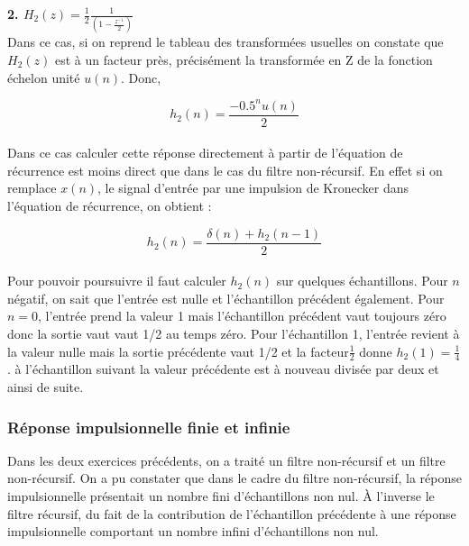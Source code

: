 \documentclass[11pt,a4paper]{article}
\begin{document}
\textbf{2. $H_2(z) = \frac{1}{2}\frac{1}{(1 - \frac{z^{-1}}{2})}$}\\

Dans ce cas, si on reprend le tableau des transformées usuelles on constate que $H_2(z)$ est à un facteur près, précisément la transformée en Z de la fonction échelon unité $u(n)$. Donc, 

\[h_2(n) = \frac{-0.5^n u(n)}{2}\]\\

Dans ce cas calculer cette réponse directement à partir de l'équation de récurrence est moins direct que dans le cas du filtre non-récursif. En effet si on remplace $x(n)$, le signal d'entrée par une impulsion de Kronecker dans l'équation de récurrence, on obtient :

\[h_2(n) = \frac{\delta(n) + h_2(n-1)}{2}\]\\

Pour pouvoir poursuivre il faut calculer $h_2(n)$ sur quelques échantillons. Pour $n$ négatif, on sait que l'entrée est nulle et l'échantillon précédent également. Pour $n=0$, l'entrée prend la valeur 1 mais l'échantillon précédent vaut toujours zéro donc la sortie vaut vaut 1/2 au temps zéro. Pour l'échantillon 1, l'entrée revient à la valeur nulle mais la sortie précédente vaut 1/2 et la facteur$ \frac{1}{2}$ donne $h_2(1) = \frac{1}{4}$. à l'échantillon suivant la valeur précédente est à nouveau divisée par deux et ainsi de suite.

\begin{center}
\end{center}

\subsubsection{Réponse impulsionnelle finie et infinie}
Dans les deux exercices précédents, on a traité un filtre non-récursif et un filtre non-récursif. On a pu constater que dans le cadre du filtre non-récursif, la réponse impulsionnelle présentait un nombre fini d'échantillons non nul. \`A l'inverse le filtre récursif, du fait de la contribution de l'échantillon précédente à une réponse impulsionnelle comportant un nombre infini d'échantillons non nul.\\
\end{document}
